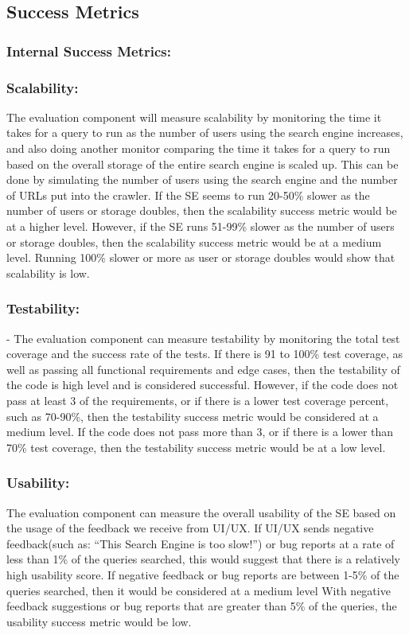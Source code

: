 \pagebreak
\subsection*{Success Metrics}

\subsubsection*{Internal Success Metrics:}

\medskip\subsubsection*{Scalability:}
The evaluation component will measure scalability by monitoring the time it takes
for a query to run as the number of users using the search engine increases, and 
also doing another monitor comparing the time it takes for a query to run based on 
the overall storage of the entire search engine is scaled up. This can be done by 
simulating the number of users using the search engine and the number of URLs put 
into the crawler. If the SE seems to run 20-50\% slower as the number of users or 
storage doubles, then the scalability success metric would be at a higher level. 
However, if the SE runs 51-99\% slower as the number of users or storage doubles, 
then the scalability success metric would be at a medium level. Running 100\% 
slower or more as user or storage doubles would show that scalability is low.

\smallskip\subsubsection*{Testability:}
- The evaluation component can measure testability by monitoring the total test 
coverage and the success rate of the tests. If there is 91 to 100\% test coverage, 
as well as passing all functional requirements and edge cases, then the 
testability of the code is high level and is considered successful. However, if 
the code does not pass at least 3 of the requirements, or if there is a lower test 
coverage percent, such as 70-90\%, then the testability success metric would be 
considered at a medium level. If the code does not pass more than 3, or if there 
is a lower than 70\% test coverage, then the testability success metric would be 
at a low level.

\smallskip\subsubsection*{Usability:}
The evaluation component can measure the overall usability of the SE based on the 
usage of the feedback we receive from UI/UX. If UI/UX sends negative feedback(such 
as: “This Search Engine is too slow!”) or bug reports at a rate of less than 1\% 
of the queries searched, this would suggest that there is a relatively high 
usability score. If negative feedback or bug reports are between 1-5\% of the 
queries searched, then it would be considered at a medium level With negative 
feedback suggestions or bug reports that are greater than 5\% of the queries, the 
usability success metric would be low.

